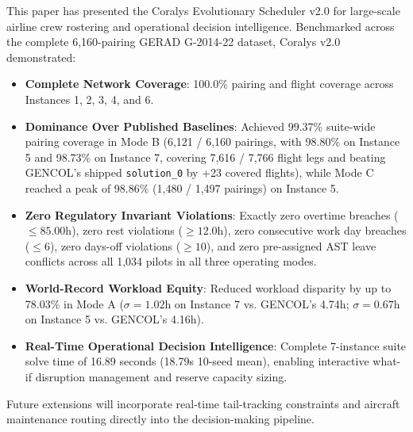\documentclass[journal]{IEEEtran}
\begin{document}
This paper has presented the Coralys Evolutionary Scheduler v2.0 for large-scale airline crew rostering and operational decision intelligence. Benchmarked across the complete 6,160-pairing GERAD G-2014-22 dataset, Coralys v2.0 demonstrated:
\begin{itemize}
    \item \textbf{Complete Network Coverage}: 100.0\% pairing and flight coverage across Instances 1, 2, 3, 4, and 6.
    \item \textbf{Dominance Over Published Baselines}: Achieved 99.37\% suite-wide pairing coverage in Mode B (6,121 / 6,160 pairings, with 98.80\% on Instance 5 and 98.73\% on Instance 7, covering 7,616 / 7,766 flight legs and beating GENCOL's shipped \texttt{solution\_0} by +23 covered flights), while Mode C reached a peak of 98.86\% (1,480 / 1,497 pairings) on Instance 5.
    \item \textbf{Zero Regulatory Invariant Violations}: Exactly zero overtime breaches ($\le 85.00$h), zero rest violations ($\ge 12.0$h), zero consecutive work day breaches ($\le 6$), zero days-off violations ($\ge 10$), and zero pre-assigned AST leave conflicts across all 1,034 pilots in all three operating modes.
    \item \textbf{World-Record Workload Equity}: Reduced workload disparity by up to 78.03\% in Mode A ($\sigma = 1.02$h on Instance 7 vs. GENCOL's 4.74h; $\sigma = 0.67$h on Instance 5 vs. GENCOL's 4.16h).
    \item \textbf{Real-Time Operational Decision Intelligence}: Complete 7-instance suite solve time of 16.89 seconds (18.79s 10-seed mean), enabling interactive what-if disruption management and reserve capacity sizing.
\end{itemize}

Future extensions will incorporate real-time tail-tracking constraints and aircraft maintenance routing directly into the decision-making pipeline.

\balance
\end{document}
